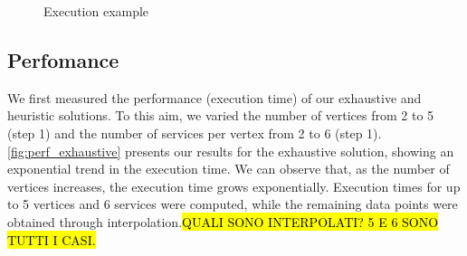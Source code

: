 \begin{figure}[!t]
{
  }
  \caption{Execution example}
  \label{fig:execution_example}
\end{figure}

\subsection{Perfomance}\label{subsec:experiments_performance}
We first measured the performance (execution time) of our exhaustive and heuristic solutions. To this aim, we varied the number of vertices from 2 to 5 (step 1) and the number of services per vertex from 2 to 6 (step 1). \cref{fig:perf_exhaustive} presents our results for the exhaustive solution, showing an exponential trend in the execution time. We can observe that, as the number of vertices increases, the execution time grows exponentially. Execution times for up to 5 vertices and 6 services were computed, while the remaining data points were obtained through interpolation.\hl{QUALI SONO INTERPOLATI? 5 E 6 SONO TUTTI I CASI.}

